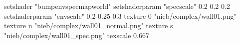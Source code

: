 setshader "bumpenvspecmapworld"
setshaderparam "specscale" 0.2 0.2 0.2
setshaderparam "envscale"  0.2 0.25 0.3
    texture 0 "nieb/complex/wall01.png"
    texture n "nieb/complex/wall01_normal.png"
    texture s "nieb/complex/wall01_spec.png"
    texscale 0.667